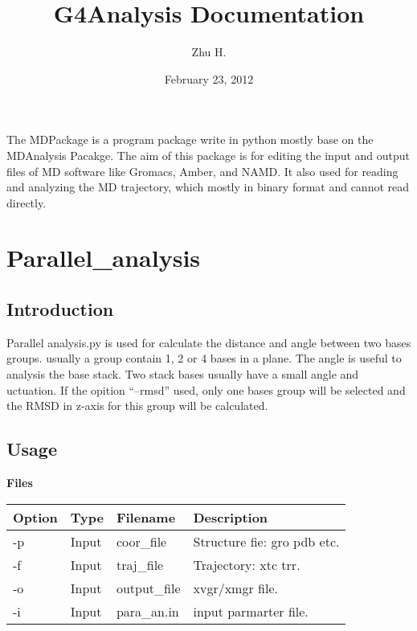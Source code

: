 \documentclass[letterpaper,10pt,english]{sphinxmanual}
\title{G4Analysis Documentation}
\date{February 23, 2012}
\author{Zhu H.}
\begin{document}
\maketitle
\tableofcontents
{}\label{index::doc}


The MDPackage is a program package write in python mostly base on the
MDAnalysis Pacakge. The aim of this package is for editing the input and
output files of MD software like Gromacs, Amber, and NAMD. It also used for
reading and analyzing the MD trajectory, which mostly in binary format and
cannot read directly.


\chapter{Parallel\_analysis}
\label{documentation_pages/Parallel_analysis:welcome-to-mdpackage-s-documentation}\label{documentation_pages/Parallel_analysis::doc}\label{documentation_pages/Parallel_analysis:parallel-analysis}

\section{Introduction}
\label{documentation_pages/Parallel_analysis:introduction}
Parallel analysis.py is used for calculate the distance and angle between two
bases groups. usually a group contain 1, 2 or 4 bases in a plane.
The angle is useful to analysis the base stack. Two stack bases usually have a
small angle and
uctuation.
If the opition ``--rmsd'' used, only one bases group will be selected and the RMSD
in z-axis for this group will be calculated.


\section{Usage}
\label{documentation_pages/Parallel_analysis:usage}
\textbf{Files}

\begin{tabulary}{\linewidth}{|L|L|L|L|}
\hline
\textbf{
Option
} & \textbf{
Type
} & \textbf{
Filename
} & \textbf{
Description
}\\
\hline

-p
 & 
Input
 & 
coor\_file
 & 
Structure fie: gro pdb etc.
\\

-f
 & 
Input
 & 
traj\_file
 & 
Trajectory: xtc trr.
\\

-o
 & 
Input
 & 
output\_file
 & 
xvgr/xmgr file.
\\

-i
 & 
Input
 & 
para\_an.in
 & 
input parmarter file.
\\
\hline
\end{tabulary}
\end{document}
